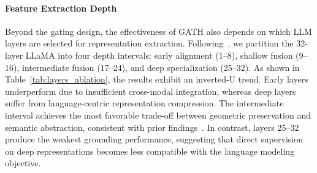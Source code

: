 \documentclass[lettersize,journal]{IEEEtran}
\begin{document}
\begin{table}[htbp]
\centering
\footnotesize  
\setlength{\tabcolsep}{3.8pt}
\caption{\textbf{Ablation Study on Feature Aggregation Strategy.}}
\label{tab:aggregation_ablation}
\end{table}

\paragraph*{Feature Extraction Depth} Beyond the gating design, the effectiveness of GATH also depends on which LLM layers are selected for representation extraction. Following~\cite{lbt2025}, we partition the 32-layer LLaMA into four depth intervals: early alignment (1--8), shallow fusion (9--16), intermediate fusion (17--24), and deep specialization (25--32). As shown in Table~\ref{tab:layers_ablation}, the results exhibit an inverted-U trend. Early layers underperform due to insufficient cross-modal integration, whereas deep layers suffer from language-centric representation compression. The intermediate interval achieves the most favorable trade-off between geometric preservation and semantic abstraction, consistent with prior findings~\cite{liu2019linguistic,voita2019bottom}. In contrast, layers 25--32 produce the weakest grounding performance, suggesting that direct supervision on deep representations becomes less compatible with the language modeling objective.
\end{document}
